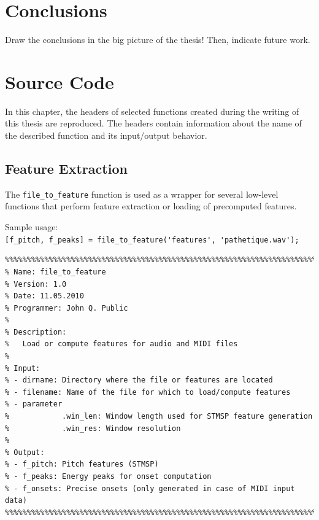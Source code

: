 \documentclass[a4paper,11pt,\myPageLayout]{book}
\begin{document}
\chapter{Conclusions}
\label{chapter:conclusions}

Draw the conclusions in the big picture of the thesis! Then, indicate future work.

\cleardoublepage{}
\appendix
\chapter{Source Code}
\label{chapter:source_code}

In this chapter, the headers of selected \MATLAB{} functions created during the writing of this thesis are reproduced. The headers contain information about the name of the described function and its input/output behavior.

\section*{Feature Extraction}
The \texttt{file\_to\_feature} function is used as a wrapper for several low-level functions that perform feature extraction or loading of precomputed features.

Sample usage:\\
\scriptsize
\verb|[f_pitch, f_peaks] = file_to_feature('features', 'pathetique.wav');|

\begin{verbatim}
%%%%%%%%%%%%%%%%%%%%%%%%%%%%%%%%%%%%%%%%%%%%%%%%%%%%%%%%%%%%%%%%%%%%%%%%%%%
% Name: file_to_feature
% Version: 1.0
% Date: 11.05.2010
% Programmer: John Q. Public
%
% Description:
%   Load or compute features for audio and MIDI files
%
% Input:
% - dirname: Directory where the file or features are located
% - filename: Name of the file for which to load/compute features
% - parameter
%            .win_len: Window length used for STMSP feature generation
%            .win_res: Window resolution
%
% Output:
% - f_pitch: Pitch features (STMSP)
% - f_peaks: Energy peaks for onset computation
% - f_onsets: Precise onsets (only generated in case of MIDI input data)
%%%%%%%%%%%%%%%%%%%%%%%%%%%%%%%%%%%%%%%%%%%%%%%%%%%%%%%%%%%%%%%%%%%%%%%%%%%
\end{verbatim}
\normalsize

\cleardoublepage{}
{
\small
{}


}
\cleardoublepage{}
\end{document}
